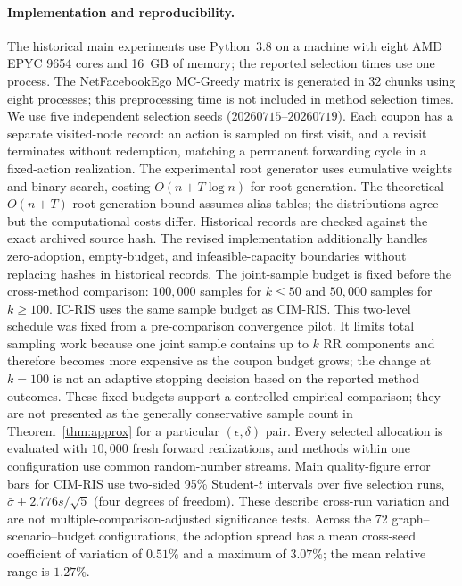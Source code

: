 \documentclass[sigconf,balance=false]{acmart}
\newcommand{\CIMRIS}{\textsc{CIM-RIS}}
\begin{document}
\paragraph{Implementation and reproducibility.}
The historical main experiments use Python~3.8 on a machine with
eight AMD EPYC 9654 cores and 16~GB of memory; the reported selection
times use one process. The NetFacebookEgo MC-Greedy matrix is generated
in 32 chunks using eight processes; this preprocessing time is not included
in method selection times. We use five independent selection seeds
($20260715$--$20260719$).
Each coupon has a separate visited-node record: an action is sampled on
first visit, and a revisit terminates without redemption, matching a
permanent forwarding cycle in a fixed-action realization.
The experimental root generator uses cumulative weights and binary search,
costing $O(n+T\log n)$ for root generation. The theoretical $O(n+T)$
root-generation bound assumes alias tables; the distributions agree but
the computational costs differ. Historical records are checked against
the exact archived source hash. The revised implementation additionally
handles zero-adoption, empty-budget, and infeasible-capacity boundaries
without replacing hashes in historical records.
The joint-sample budget is fixed before the cross-method comparison:
$100{,}000$ samples for $k\leq50$ and $50{,}000$ samples for $k\geq100$.
IC-RIS uses the same sample budget as \CIMRIS{}.
This two-level schedule was fixed from a pre-comparison convergence pilot.
It limits total sampling work because one joint sample contains up to $k$ RR
components and therefore becomes more expensive as the coupon budget grows;
the change at $k=100$ is not an adaptive stopping decision based on the
reported method outcomes.
These fixed budgets support a controlled empirical comparison; they are
not presented as the generally conservative sample count in
Theorem~\ref{thm:approx} for a particular $(\epsilon,\delta)$ pair.
Every selected allocation is evaluated with $10{,}000$ fresh forward
realizations, and methods within one configuration use common random-number
streams.
Main quality-figure error bars for \CIMRIS{} use two-sided 95\% Student-$t$
intervals over five selection runs, $\bar\sigma\pm2.776s/\sqrt{5}$
(four degrees of freedom). These describe cross-run variation and are not
multiple-comparison-adjusted significance tests.
Across the 72 graph--scenario--budget configurations, the adoption spread
has a mean cross-seed coefficient of variation of $0.51\%$ and a maximum
of $3.07\%$; the mean relative range is $1.27\%$.
\end{document}
